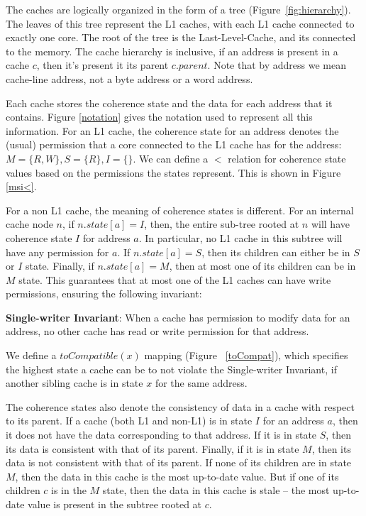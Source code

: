 The caches are logically organized in the form of a tree
(Figure~\ref{fig:hierarchy}). The leaves of this tree represent the L1 caches,
with each L1 cache connected to exactly one core. The root of the tree is the
Last-Level-Cache, and its connected to the memory. The cache hierarchy is
inclusive, \ie if an address is present in a cache $c$, then it's present it its
parent $c.parent$. Note that by address we mean cache-line address, not a byte
address or a word address.

Each cache stores the coherence state and the data for each address that it
contains.
Figure \ref{notation} gives the notation used to represent all this
information. For an L1 cache, the coherence state for an address denotes the
(usual) permission that a core connected to the L1 cache has for the address: $M
= \{R, W\}, S = \{R\}, I = \{\}$. We can define a $<$ relation for coherence
state values based on the permissions the states represent. This is shown in
Figure \ref{msi<}.

For a non L1 cache, the meaning of coherence states is different. For an
internal cache node $n$, if $n.state[a] = I$, then, the entire sub-tree rooted at $n$
will have coherence state $I$ for address $a$. In particular, no L1 cache in
this subtree will have any permission for $a$. If $n.state[a] = S$, then its
children can either be in $S$ or $I$ state. Finally, if $n.state[a] = M$, then
at most one of its children can be in $M$ state. This guarantees that at most
one of the L1 caches can have write permissions, ensuring the following
invariant:

\begin{theorem}
\textbf{Single-writer Invariant}: When a cache has permission to modify data for
an address, no other cache has read or write permission for that
address.
\label{singleWriter}
\end{theorem}

We define a $toCompatible(x)$ mapping (Figure ~\ref{toCompat}), which specifies
the highest state a cache can be to not violate the Single-writer Invariant, if
another sibling cache is in state $x$ for the same address.

The coherence states also denote the consistency of data in a cache with respect
to its parent. If a cache (both L1 and non-L1) is in state $I$ for an address $a$,
then it does not have the data corresponding to that address. If it is in state
$S$, then its data is consistent with that of its parent. Finally, if it is in
state $M$, then its data is not consistent with that of its parent. If none of
its children are in state $M$, then the data in this cache is the most
up-to-date value. But if one of its children $c$ is in the $M$ state, then the
data in this cache is stale -- the most up-to-date value is present in the
subtree rooted at $c$.

